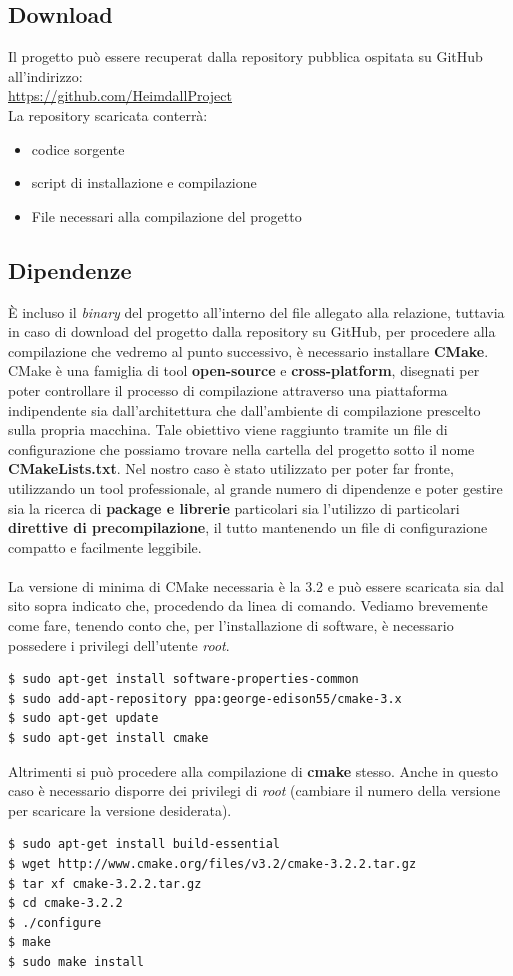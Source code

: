 \documentclass[italian]{tktltiki2}
\begin{document}
\subsection{Download}
Il progetto può essere recuperat dalla repository pubblica ospitata su GitHub all'indirizzo:
\\
\url{https://github.com/HeimdallProject} 
\\
La repository scaricata conterrà:
\begin{itemize}
  \item codice sorgente
  \item script di installazione e compilazione
  \item File necessari alla compilazione del progetto
\end{itemize}
\subsection{Dipendenze}
È incluso il \emph{binary} del progetto all'interno del file allegato alla relazione, tuttavia in caso di download del progetto dalla repository su GitHub, per procedere alla compilazione che vedremo al punto successivo, è necessario installare \textbf{CMake}.\\
CMake\cite{cmake} è una famiglia di tool \textbf{open-source} e \textbf{cross-platform}, disegnati per poter controllare il processo di compilazione attraverso una piattaforma indipendente sia dall'architettura che dall'ambiente di compilazione prescelto sulla propria macchina. Tale obiettivo viene raggiunto tramite un file di configurazione che possiamo trovare nella cartella del progetto sotto il nome \textbf{CMakeLists.txt}. Nel nostro caso è stato utilizzato per poter far fronte, utilizzando un tool professionale, al grande numero di dipendenze e poter gestire sia la ricerca di \textbf{package e librerie} particolari sia l'utilizzo di particolari \textbf{direttive di precompilazione}, il tutto mantenendo un file di configurazione compatto e facilmente leggibile. \\\\
La versione di minima di CMake necessaria è la 3.2 e può essere scaricata sia dal sito sopra indicato che, procedendo da linea di comando. Vediamo brevemente come fare, tenendo conto che, per l'installazione di software, è necessario possedere i privilegi dell'utente \emph{root}.
\begin{lstlisting}
$ sudo apt-get install software-properties-common
$ sudo add-apt-repository ppa:george-edison55/cmake-3.x
$ sudo apt-get update
$ sudo apt-get install cmake
\end{lstlisting}
Altrimenti si può procedere alla compilazione di \textbf{cmake} stesso. Anche in questo caso è necessario disporre dei privilegi di \emph{root} (cambiare il numero della versione per scaricare la versione desiderata).
\begin{lstlisting}
$ sudo apt-get install build-essential
$ wget http://www.cmake.org/files/v3.2/cmake-3.2.2.tar.gz
$ tar xf cmake-3.2.2.tar.gz
$ cd cmake-3.2.2
$ ./configure
$ make
$ sudo make install
\end{lstlisting}
\end{document}
